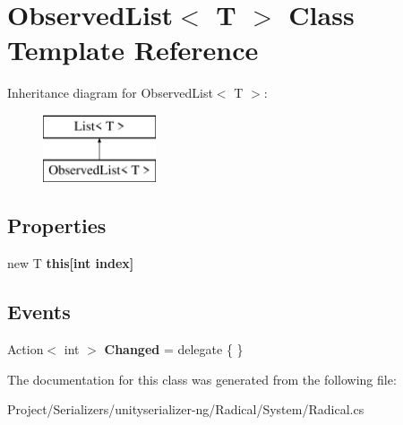 \hypertarget{class_observed_list}{}\section{Observed\+List$<$ T $>$ Class Template Reference}
\label{class_observed_list}
Inheritance diagram for Observed\+List$<$ T $>$\+:\begin{figure}[H]
\begin{center}
\leavevmode
\includegraphics[height=2.000000cm]{class_observed_list}
\end{center}
\end{figure}
\subsection*{Properties}
\begin{DoxyCompactItemize}
\item 
\mbox{\label{class_observed_list_a87636f926bf60362db38cddc0740960b}} 
new T {\bfseries this\mbox{[}int index\mbox{]}}
\end{DoxyCompactItemize}
\subsection*{Events}
\begin{DoxyCompactItemize}
\item 
\mbox{\label{class_observed_list_a0f2e4ec62d0fbcb270aab7a81005e7b1}} 
Action$<$ int $>$ {\bfseries Changed} = delegate \{ \}
\end{DoxyCompactItemize}


The documentation for this class was generated from the following file\+:\begin{DoxyCompactItemize}
\item 
Project/\+Serializers/unityserializer-\/ng/\+Radical/\+System/Radical.\+cs\end{DoxyCompactItemize}
